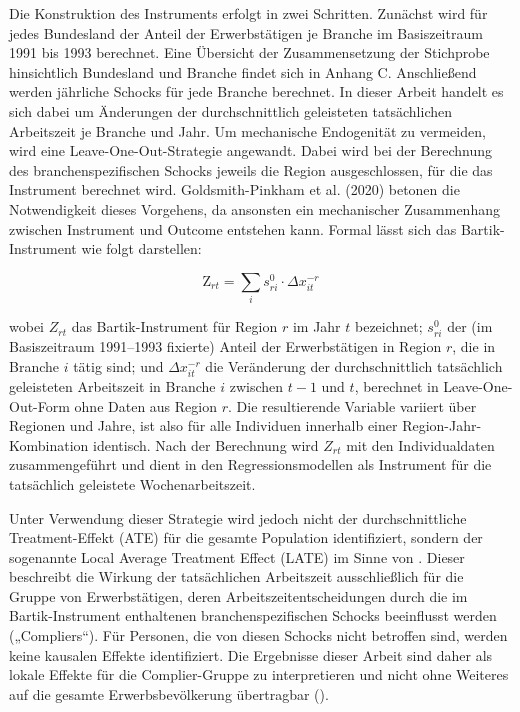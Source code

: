 \documentclass[12pt,a4paper]{article}
\begin{document}
Die Konstruktion des Instruments erfolgt in zwei Schritten. Zunächst wird für jedes Bundesland der Anteil der Erwerbstätigen je Branche im Basiszeitraum 1991 bis 1993 berechnet. Eine Übersicht der Zusammensetzung der Stichprobe hinsichtlich Bundesland und Branche findet sich in Anhang C. Anschließend werden jährliche Schocks für jede Branche berechnet. In dieser Arbeit handelt es sich dabei um Änderungen der durchschnittlich geleisteten tatsächlichen Arbeitszeit je Branche und Jahr. Um mechanische Endogenität zu vermeiden, wird eine Leave-One-Out-Strategie angewandt. Dabei wird bei der Berechnung des branchenspezifischen Schocks jeweils die Region ausgeschlossen, für die das Instrument berechnet wird. Goldsmith-Pinkham et al. (2020) betonen die Notwendigkeit dieses Vorgehens, da ansonsten ein mechanischer Zusammenhang zwischen Instrument und Outcome entstehen kann. Formal lässt sich das Bartik-Instrument wie folgt darstellen:

\begin{equation}
\text{Z}_{rt} = \sum_is^0_{ri}\cdot\Delta x^{-r}_{it}
\end{equation}

wobei $Z_{rt}$ das Bartik-Instrument für Region $r$ im Jahr $t$ bezeichnet; $s^{0}_{ri}$ der (im Basiszeitraum 1991–1993 fixierte) Anteil der Erwerbstätigen in Region $r$, die in Branche $i$ tätig sind; und $\Delta x^{-r}_{it}$ die Veränderung der durchschnittlich tatsächlich geleisteten Arbeitszeit in Branche $i$ zwischen $t-1$ und $t$, berechnet in Leave-One-Out-Form ohne Daten aus Region $r$. Die resultierende Variable variiert über Regionen und Jahre, ist also für alle Individuen innerhalb einer Region-Jahr-Kombination identisch. Nach der Berechnung wird $Z_{rt}$ mit den Individualdaten zusammengeführt und dient in den Regressionsmodellen als Instrument für die tatsächlich geleistete Wochenarbeitszeit. 

Unter Verwendung dieser Strategie wird jedoch nicht der durchschnittliche Treatment-Effekt (ATE) für die gesamte Population identifiziert, sondern der sogenannte Local Average Treatment Effect (LATE) im Sinne von \textcite{imbens1994}. Dieser beschreibt die Wirkung der tatsächlichen Arbeitszeit ausschließlich für die Gruppe von Erwerbstätigen, deren Arbeitszeitentscheidungen durch die im Bartik-Instrument enthaltenen branchenspezifischen Schocks beeinflusst werden („Compliers“). Für Personen, die von diesen Schocks nicht betroffen sind, werden keine kausalen Effekte identifiziert. Die Ergebnisse dieser Arbeit sind daher als lokale Effekte für die Complier-Gruppe zu interpretieren und nicht ohne Weiteres auf die gesamte Erwerbsbevölkerung übertragbar (\cite{angrist2009}).
\end{document}
